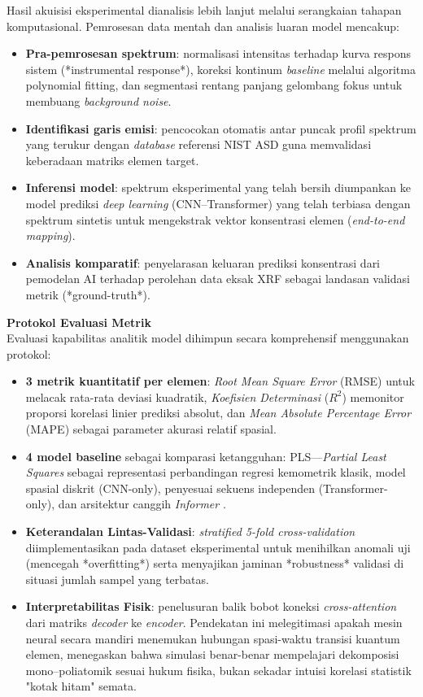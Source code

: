 \documentclass[12pt, a4paper]{article}
\begin{document}
Hasil akuisisi eksperimental dianalisis lebih lanjut melalui serangkaian tahapan komputasional. Pemrosesan data mentah dan analisis luaran model mencakup:
\begin{itemize}[leftmargin=2cm]
    \item \textbf{Pra-pemrosesan spektrum}: normalisasi intensitas terhadap kurva respons sistem (*instrumental response*), koreksi kontinum \textit{baseline} melalui algoritma polynomial fitting, dan segmentasi rentang panjang gelombang fokus untuk membuang \textit{background noise}.
    \item \textbf{Identifikasi garis emisi}: pencocokan otomatis antar puncak profil spektrum yang terukur dengan \textit{database} referensi NIST ASD guna memvalidasi keberadaan matriks elemen target.
    \item \textbf{Inferensi model}: spektrum eksperimental yang telah bersih diumpankan ke model prediksi \textit{deep learning} (CNN--Transformer) yang telah terbiasa dengan spektrum sintetis untuk mengekstrak vektor konsentrasi elemen (\textit{end-to-end mapping}).
    \item \textbf{Analisis komparatif}: penyelarasan keluaran prediksi konsentrasi dari pemodelan AI terhadap perolehan data eksak XRF sebagai landasan validasi metrik (*ground-truth*).
\end{itemize}

\textbf{Protokol Evaluasi Metrik} \\
Evaluasi kapabilitas analitik model dihimpun secara komprehensif menggunakan protokol:
\begin{itemize}[leftmargin=2cm]
    \item \textbf{3 metrik kuantitatif per elemen}: \textit{Root Mean Square Error} (RMSE) untuk melacak rata-rata deviasi kuadratik, \textit{Koefisien Determinasi} ($R^2$) memonitor proporsi korelasi linier prediksi absolut, dan \textit{Mean Absolute Percentage Error} (MAPE) sebagai parameter akurasi relatif spasial.
    \item \textbf{4 model baseline} sebagai komparasi ketangguhan: PLS—\textit{Partial Least Squares} \cite{wold2001} sebagai representasi perbandingan regresi kemometrik klasik, model spasial diskrit (CNN-only), penyesuai sekuens independen (Transformer-only), dan arsitektur canggih \textit{Informer} \cite{zhou2021, walidain2026}.
    \item \textbf{Keterandalan Lintas-Validasi}: \textit{stratified 5-fold cross-validation} diimplementasikan pada dataset eksperimental untuk menihilkan anomali uji (mencegah *overfitting*) serta menyajikan jaminan *robustness* validasi di situasi jumlah sampel yang terbatas.
    \item \textbf{Interpretabilitas Fisik}: penelusuran balik bobot koneksi \textit{cross-attention} dari matriks \textit{decoder} ke \textit{encoder}. Pendekatan ini melegitimasi apakah mesin neural secara mandiri menemukan hubungan spasi-waktu transisi kuantum elemen, menegaskan bahwa simulasi benar-benar mempelajari dekomposisi mono--poliatomik sesuai hukum fisika, bukan sekadar intuisi korelasi statistik "kotak hitam" semata.
\end{itemize}
\end{document}
